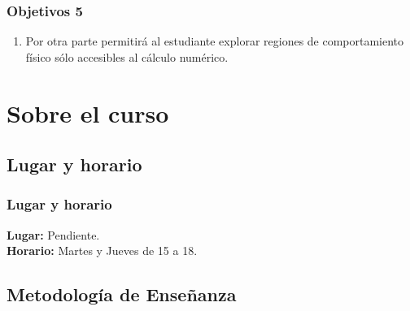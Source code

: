 \documentclass[12pt]{beamer}
\begin{document}
\begin{frame}
\frametitle{Objetivos 5}
\begin{enumerate}[<+->]
\conti
\item  Por otra parte permitirá al estudiante explorar regiones de comportamiento físico sólo accesibles al cálculo numérico.
\end{enumerate}
\end{frame}

\section{Sobre el curso}
\subsection{Lugar y horario}

\begin{frame}
\frametitle{Lugar y horario} 
\textbf{Lugar: } Pendiente.
\\
\bigskip
\textbf{Horario: } Martes y Jueves de 15 a 18.
\end{frame}

\subsection{Metodología de Enseñanza}
\end{document}
